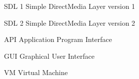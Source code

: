 \begin{siglas}
  \item[SDL 1] Simple DirectMedia Layer version 1
  \item[SDL 2] Simple DirectMedia Layer version 2
  \item[API] Application Program Interface
  \item[GUI] Graphical User Interface
  \item[VM] Virtual Machine
\end{siglas}
%